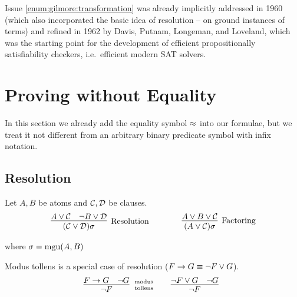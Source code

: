 Issue \ref{enum:gilmore:transformation} was already implicitly
addressed in 1960 \cite{Davis:1960:CPQ:321033.321034}
(which also incorporated the basic idea of resolution -- on ground instances of terms)
and refined in 1962 \cite{Davis:1962:MPT:368273.368557}
by Davis, Putnam, Longeman, and Loveland,
which was the starting point for the development of efficient propositionally satisfiability checkers, i.e.~efficient modern SAT solvers.


\section{Proving without Equality}\label{sec:proving:without:equaltiy}

In this section we already add the equality symbol \(\approx\) into our formulae,
but we treat it not different from an arbitrary binary predicate symbol with infix notation.

\subsection{Resolution}\label{sec:resolution}

\begin{definition}\label{def:resolution} Let \(A, B\) be atoms and \(\mathcal{C},\mathcal{D}\) be clauses.
	\begin{gather*}
	\infer
	[\text{Resolution}]
	{(\mcC\lor\mcD)\sigma}
	{A\lor\mcC&\lnot B\lor\mcD}
	\qquad\qquad
	\infer
	[\text{Factoring}]
	{(A\lor\mcC)\sigma}
	{A\lor B\lor\mcC}
	\end{gather*}
	\begin{center}
		where
		\(\sigma=\operatorname{mgu}(A,B)\)
	\end{center}
\end{definition}

\begin{example}Modus tollens is a special case of resolution (\(F\rightarrow G\equiv \lnot F\lor G\)).
	\begin{gather*}
	\infer[\text{modus}\atop\text{tollens}]{\lnot F}{F\limp G & \lnot G}
	\qquad
	\infer[]{\lnot F}{\lnot F\lor G & \lnot G}
	\end{gather*}
\end{example}


